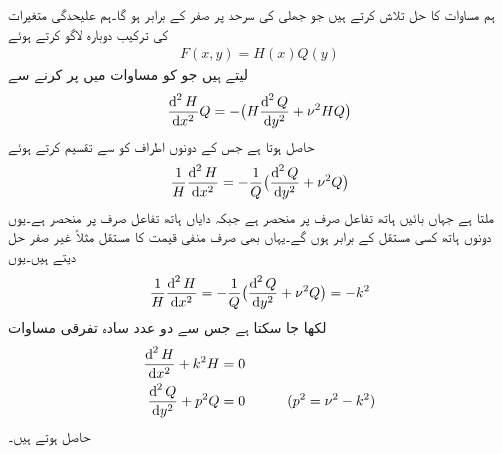 ہم  مساوات  کا حل تلاش کرتے ہیں جو جھلی کی سرحد پر صفر کے برابر ہو گا۔ہم علیحدگی متغیرات کی ترکیب دوبارہ لاگو کرتے ہوئے
\begin{align}
F(x,y)=H(x)Q(y)
\end{align}
لیتے ہیں جو کو مساوات  میں پر کرنے سے 
\begin{align*}
\frac{\dif^{\,2} H}{\dif x^2}Q=-\big(H\frac{\dif^{\,2} Q}{\dif y^2}+\nu^2HQ\big)
\end{align*}
حاصل ہوتا ہے جس کے دونوں اطراف کو  سے تقسیم کرتے ہوئے
\begin{align*}
\frac{1}{H}\frac{\dif^{\,2}H}{\dif x^2}=-\frac{1}{Q}\big(\frac{\dif^{\,2}Q}{\dif y^2}+\nu^2Q\big)
\end{align*}
ملتا ہے جہاں بائیں ہاتھ تفاعل صرف  پر منحصر ہے جبکہ دایاں ہاتھ تفاعل صرف  پر منحصر ہے۔یوں دونوں ہاتھ کسی مستقل کے برابر ہوں گے۔یہاں بھی صرف منفی قیمت کا مستقل مثلاً  غیر صفر حل دیتے ہیں۔یوں
\begin{align*}
\frac{1}{H}\frac{\dif^{\,2}H}{\dif x^2}=-\frac{1}{Q}\big(\frac{\dif^{\,2}Q}{\dif y^2}+\nu^2Q\big)=-k^2
\end{align*}
لکھا جا سکتا ہے جس سے دو عدد سادہ تفرقی مساوات 
\begin{align}
\frac{\dif^{\,2}H}{\dif x^2}+k^2H&=0\label{مساوات_جزوی_جھلی_ایکس}\\
\frac{\dif^{\,2}Q}{\dif y^2}+p^2Q&=0\quad \quad \quad (p^2=\nu^2-k^2)\label{مساوات_جزوی_جھلی_وائے}
\end{align}
حاصل ہوتے ہیں۔

